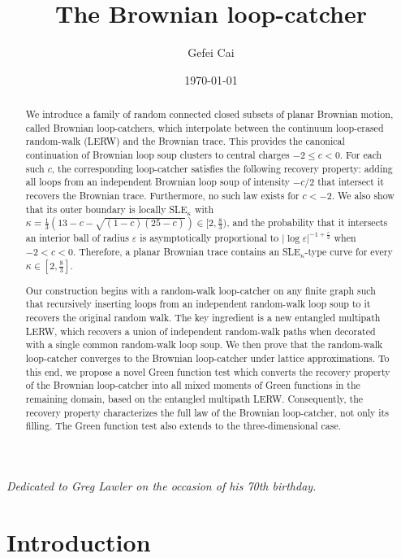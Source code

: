 \documentclass[11pt]{article}
\title{The Brownian loop-catcher}
\author{Gefei Cai}
\date{\today}
\numberwithin{equation}{section}
\newcommand{\1}{\mathbf{1}}
\begin{document}
\maketitle

\begin{center}
\emph{Dedicated to Greg Lawler on the occasion of his 70th birthday.}
\end{center}
\vspace{0.5em}

\begin{abstract}
We introduce a family of random connected closed subsets of planar Brownian motion, called Brownian loop-catchers, which interpolate between the continuum loop-erased random-walk (LERW) and the Brownian trace. This provides the canonical continuation of Brownian loop soup clusters to central charges $-2\le c<0$. For each such $c$, the corresponding loop-catcher satisfies the following recovery property: adding all loops from an independent Brownian loop soup of intensity $-c/2$ that intersect it recovers the Brownian trace. Furthermore, no such law exists for $c<-2$. We also show that its outer boundary is locally SLE$_\kappa$ with $\kappa = \frac{1}{3}\left(13 - c - \sqrt{(1-c)(25-c)}\right)\in[2,\frac83)$, and the probability that it intersects an interior ball of radius $\varepsilon$ is asymptotically proportional to $|\log\varepsilon|^{-1+\frac{c}{2}}$ when $-2<c<0$. Therefore, a planar Brownian trace contains an SLE$_\kappa$-type curve for every $\kappa\in[2,\frac83]$. 

Our construction begins with a random-walk loop-catcher on any finite graph such that recursively inserting loops from an independent random-walk loop soup to it recovers the original random walk. The key ingredient is a new entangled multipath LERW, which recovers a union of independent random-walk paths when decorated with a single common random-walk loop soup.
We then prove that the random-walk loop-catcher converges to the Brownian loop-catcher under lattice approximations. 
To this end, we propose a novel Green function test which converts the recovery property of the Brownian loop-catcher into all mixed moments of Green functions in the remaining domain, based on the entangled multipath LERW. Consequently, the recovery property characterizes the full law of the Brownian loop-catcher, not only its filling. The Green function test also extends to the three-dimensional case.
\end{abstract}

\section{Introduction}
\end{document}
